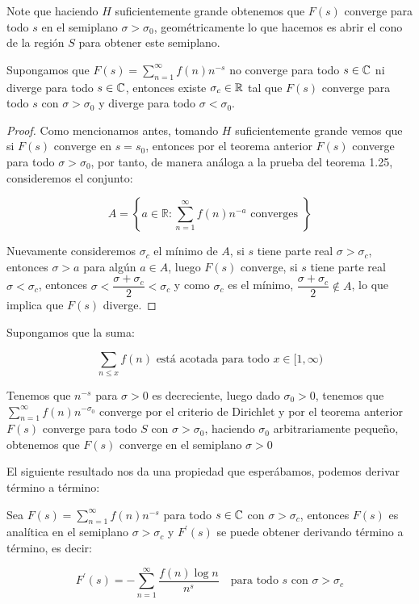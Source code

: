Note que haciendo $H$ suficientemente grande obtenemos que $F(s)$ converge para todo  $s$ en el semiplano $\sigma>\sigma_0$, geométricamente lo que hacemos es abrir el cono de la región $S$ para obtener este semiplano.\cite{montgomery2007multiplicative}

\begin{theorem}
Supongamos que $F(s)=\displaystyle\sum_{n=1}^{\infty} f(n)n^{-s}$ no converge para todo $s\in \mathbb{C}$ ni diverge para todo $s\in\mathbb{C}$, entonces existe $\sigma_c\in \mathbb{R}$ tal que $F(s)$ converge para todo $s$ con $\sigma>\sigma_0$ y diverge para todo $\sigma<\sigma_0$.
\end{theorem}


\begin{proof}
Como mencionamos antes, tomando $H$ suficientemente grande vemos que si $F(s)$ converge en $s=s_0$, entonces por el teorema anterior $F(s)$ converge para todo $\sigma>\sigma_0$, por tanto, de manera análoga a la prueba del teorema 1.25, consideremos el conjunto:

$$A=\left\{a \in \mathbb{R} : \sum_{n=1}^{\infty} f(n) n^{-a} \text { converges }\right\}$$

Nuevamente  consideremos $\sigma_c$ el mínimo de $A$, si $s$ tiene parte real $\sigma>\sigma_c$, entonces $\sigma>a$ para algún $a\in A$, luego $F(s)$ converge, si $s$ tiene parte real $\sigma<\sigma_c$, entonces $\sigma<\dfrac{\sigma+\sigma_c}{2}<\sigma_c$ y como $\sigma_c$ es el mínimo, $\dfrac{\sigma+\sigma_c}{2}\not\in A$, lo que implica que $F(s)$ diverge.
\end{proof}

\begin{eg}
Supongamos que la suma:

$$\sum_{n\leq x}f(n) \text{ está acotada para  todo }x\in [1,\infty)$$

Tenemos que $n^{-s}$ para $\sigma>0$ es decreciente, luego dado $\sigma_0>0$, tenemos que $\displaystyle\sum_{n=1}^{\infty}f(n)n^{-\sigma_0}$ converge por el criterio de Dirichlet y por el teorema anterior $F(s)$ converge para todo $S$ con $\sigma>\sigma_0$, haciendo $\sigma_0$ arbitrariamente pequeño, obtenemos que $F(s)$  converge en el semiplano $\sigma>0$
\end{eg}

El siguiente resultado nos da una propiedad que esperábamos, podemos derivar término a término:

\begin{corollary}
Sea $F(s)=\displaystyle\sum_{n=1}^{\infty} f(n)n^{-s}$ para todo $s\in \mathbb{C}$ con $\sigma>\sigma_c$, entonces $F(s)$ es analítica en el semiplano $\sigma>\sigma_c$ y $F^{\prime}(s)$ se puede obtener derivando término a término, es decir:

$$F^{\prime}(s)=-\sum_{n=1}^{\infty}\frac{f(n)\log n}{n^s} \quad \text{para todo } s \text{ con } \sigma>\sigma_c$$
\end{corollary}


